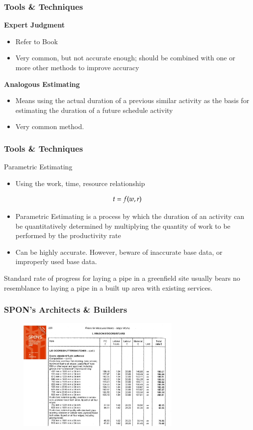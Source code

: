 \begin{frame}
\frametitle{Tools \& Techniques}
\textbf{Expert Judgment}
\begin{itemize}
	\item Refer to Book
	\item Very common, but not accurate enough; should be combined with one or more other methods to improve accuracy
\end{itemize}

\textbf{Analogous Estimating}
\begin{itemize}
	\item Means using the actual duration of a previous similar activity as the basis for estimating the duration of a future schedule activity
	\item Very common method.
\end{itemize}
\end{frame}




\begin{frame}
\frametitle{Tools \& Techniques}
Parametric Estimating
\begin{itemize}
	\item Using the work, time, resource relationship
\end{itemize}


\begin{equation}
t=f(w,r) \notag
\end{equation} 


\begin{itemize}
	\item Parametric Estimating is a process by which the duration of an activity can be quantitatively determined by multiplying the quantity of work to be performed by the productivity rate 
	\item Can be highly accurate.  However, beware of inaccurate base data, or improperly used base data.
\end{itemize}

\end{frame}

Standard rate of progress for laying a pipe in a greenfield site usually bears no resemblance to laying a pipe in a built up area with existing services.


\begin{frame}
\frametitle{SPON's Architects \& Builders}
\begin{figure}
	\centering
		\includegraphics[width = 8cm]{images/Spon1.jpg}
	\label{fig:Spon1}
\end{figure}

\end{frame}




